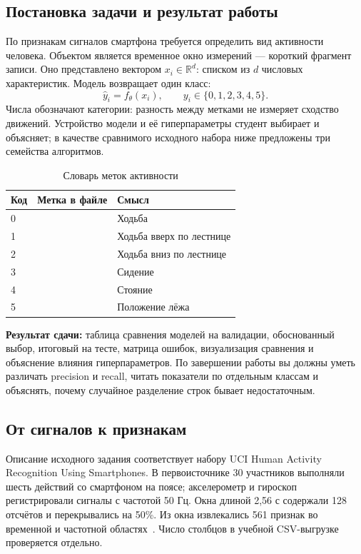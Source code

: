 \subsection{Постановка задачи и результат работы}
По признакам сигналов смартфона требуется определить вид активности человека. Объектом является временное окно измерений --- короткий фрагмент записи. Оно представлено вектором \(x_i\in\mathbb R^d\): списком из \(d\) числовых характеристик. Модель возвращает один класс:
\begin{equation}
\widehat y_i=f_\theta(x_i),\qquad y_i\in\{0,1,2,3,4,5\}.
\end{equation}
Числа обозначают категории: разность между метками не измеряет сходство движений. Устройство модели и её гиперпараметры студент выбирает и объясняет; в качестве сравнимого исходного набора ниже предложены три семейства алгоритмов.

\begin{table}[H]\centering\small
\caption{Словарь меток активности}
\begin{tabularx}{\textwidth}{@{}l l Y@{}}
\toprule
Код & Метка в файле & Смысл \\
 &  & Ходьба \\
1 &  & Ходьба вверх по лестнице \\
2 &  & Ходьба вниз по лестнице \\
3 &  & Сидение \\
4 &  & Стояние \\
5 &  & Положение лёжа \\
\bottomrule
\end{tabularx}\end{table}

\textbf{Результат сдачи:} таблица сравнения моделей на валидации, обоснованный выбор, итоговый  на тесте, матрица ошибок, визуализация сравнения и объяснение влияния гиперпараметров. По завершении работы вы должны уметь различать precision и recall, читать показатели по отдельным классам и объяснять, почему случайное разделение строк бывает недостаточным.

\subsection{От сигналов к признакам}
Описание исходного задания соответствует набору UCI Human Activity Recognition Using Smartphones. В первоисточнике 30 участников выполняли шесть действий со смартфоном на поясе; акселерометр и гироскоп регистрировали сигналы с частотой 50 Гц. Окна длиной 2,56 с содержали 128 отсчётов и перекрывались на 50\%. Из окна извлекались 561 признак во временной и частотной областях~\cite{har}. Число столбцов в учебной CSV-выгрузке проверяется отдельно.

